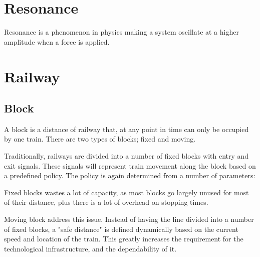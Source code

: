 \section{Resonance}

Resonance is a phenomenon in physics making a system oscillate at a higher amplitude when a force is applied.

\section{Railway}


\subsection{Block}
A block is a distance of railway that, at any point in time can only be occupied by one train. There are two types of blocks; fixed and moving.

Traditionally, railways are divided into a number of fixed blocks with entry and exit signals. These signals will represent train movement along the block based on a predefined policy. The policy is again determined from a number of parameters:






Fixed blocks wastes a lot of capacity, as most blocks go largely unused for most of their distance, plus there is a lot of overhead on stopping times.

Moving block address this issue. Instead of having the line divided into a number of fixed blocks, a "safe distance" is defined dynamically based on the current speed and location of the train.
This greatly increases the requirement for the technological infrastructure, and the dependability of it.

